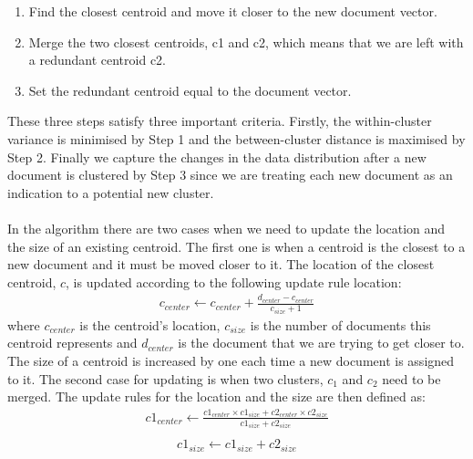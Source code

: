 \begin{enumerate}
  \item Find the closest centroid and move it closer to the new document vector. 
  \item Merge the two closest centroids, c1 and c2, which means that we are left with a redundant centroid c2.
  \item Set the redundant centroid equal to the document vector. 
\end{enumerate}
These three steps satisfy three important criteria. Firstly, the within-cluster variance is minimised by Step 1 and the between-cluster distance is maximised by Step 2. Finally we capture the changes in the data distribution after a new document is clustered by Step 3 since we are treating each new document as an indication to a potential new cluster.\\\\
In the algorithm there are two cases when we need to update the location and the size of an existing centroid. The first one is when a centroid is the closest to a new document and it must be moved closer to it. The location of the closest centroid, $c$, is updated according to the following update rule location:
\begin{eqnarray}
c_{center} \leftarrow c_{center} + \frac{d_{center} - c_{center}}{c_{size} + 1}    
\end{eqnarray}  
where $c_{center}$ is the centroid's location, $c_{size}$ is the number of documents this centroid represents and $d_{center}$ is the document that we are trying to get closer to. The size of a centroid is increased by one each time a new document is assigned to it. The second case for updating is when two clusters, $c_1$ and $c_2$ need to be merged. The update rules for the location and the size are then defined as:
\begin{eqnarray}
c1_{center} \leftarrow \frac{c1_{center} \times c1_{size} + c2_{center} \times c2_{size}}{c1_{size} + c2_{size}} \\
\end{eqnarray}  
\begin{eqnarray}
c1_{size} \leftarrow c1_{size} + c2_{size} 
\end{eqnarray}  


